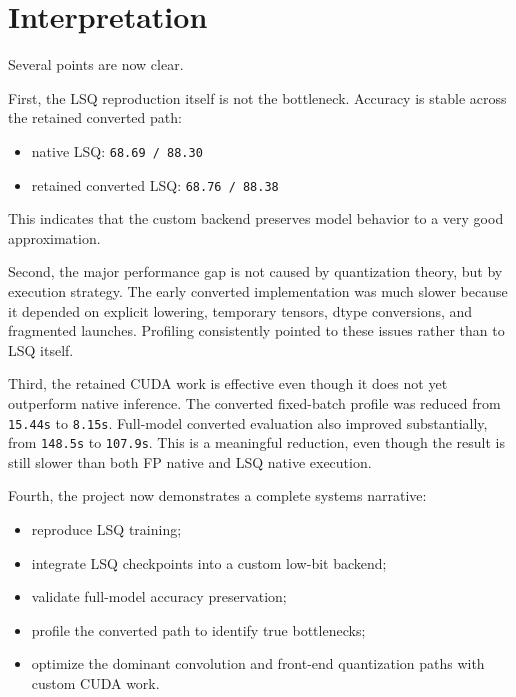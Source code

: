 \documentclass[11pt,a4paper]{article}
\begin{document}
\section{Interpretation}
Several points are now clear.

First, the LSQ reproduction itself is not the bottleneck. Accuracy is stable across the retained converted path:
\begin{itemize}
  \item native LSQ: \texttt{68.69 / 88.30}
  \item retained converted LSQ: \texttt{68.76 / 88.38}
\end{itemize}
This indicates that the custom backend preserves model behavior to a very good approximation.

Second, the major performance gap is not caused by quantization theory, but by execution strategy. The early converted implementation was much slower because it depended on explicit lowering, temporary tensors, dtype conversions, and fragmented launches. Profiling consistently pointed to these issues rather than to LSQ itself.

Third, the retained CUDA work is effective even though it does not yet outperform native inference. The converted fixed-batch profile was reduced from \texttt{15.44s} to \texttt{8.15s}. Full-model converted evaluation also improved substantially, from \texttt{148.5s} to \texttt{107.9s}. This is a meaningful reduction, even though the result is still slower than both FP native and LSQ native execution.

Fourth, the project now demonstrates a complete systems narrative:
\begin{itemize}
  \item reproduce LSQ training;
  \item integrate LSQ checkpoints into a custom low-bit backend;
  \item validate full-model accuracy preservation;
  \item profile the converted path to identify true bottlenecks;
  \item optimize the dominant convolution and front-end quantization paths with custom CUDA work.
\end{itemize}
\end{document}
